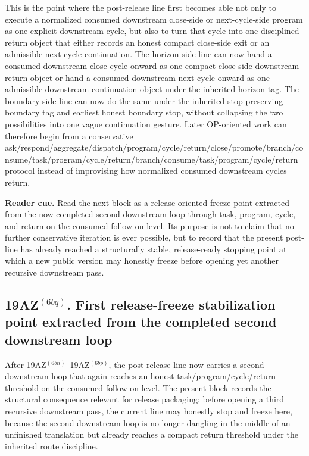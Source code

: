 \begin{remark}
\label{rem:what-the-first-downstream-cycle-to-return-interface-on-the-consumed-follow-on-level-now-buys}
This is the point where the post-release line first becomes able not only to execute a normalized consumed downstream close-side or next-cycle-side program as one explicit downstream cycle, but also to turn that cycle into one disciplined return object that either records an honest compact close-side exit or an admissible next-cycle continuation. The horizon-side line can now hand a consumed downstream close-cycle onward as one compact close-side downstream return object or hand a consumed downstream next-cycle onward as one admissible downstream continuation object under the inherited horizon tag. The boundary-side line can now do the same under the inherited stop-preserving boundary tag and earliest honest boundary stop, without collapsing the two possibilities into one vague continuation gesture. Later OP-oriented work can therefore begin from a conservative ask/\allowbreak{}respond/\allowbreak{}aggregate/\allowbreak{}dispatch/\allowbreak{}program/\allowbreak{}cycle/\allowbreak{}return/\allowbreak{}close/\allowbreak{}promote/\allowbreak{}branch/\allowbreak{}consume/\allowbreak{}task/\allowbreak{}program/\allowbreak{}cycle/\allowbreak{}return/\allowbreak{}branch/\allowbreak{}consume/\allowbreak{}task/\allowbreak{}program/\allowbreak{}cycle/\allowbreak{}return protocol instead of improvising how normalized consumed downstream cycles return.
\end{remark}


\noindent\textbf{Reader cue.} Read the next block as a release-oriented freeze point extracted from the now completed second downstream loop through task, program, cycle, and return on the consumed follow-on level. Its purpose is not to claim that no further conservative iteration is ever possible, but to record that the present post- line has already reached a structurally stable, release-ready stopping point at which a new public version may honestly freeze before opening yet another recursive downstream pass.

\subsection*{19AZ$^{(6bq)}$. First release-freeze stabilization point extracted from the completed second downstream loop}
\label{sec:first-release-freeze-stabilization-point-extracted-from-the-completed-second-downstream-loop}
After 19AZ$^{(6bn)}$--19AZ$^{(6bp)}$, the post-release line now carries a second downstream loop that again reaches an honest task/program/cycle/return threshold on the consumed follow-on level. The present block records the structural consequence relevant for release packaging: before opening a third recursive downstream pass, the current line may honestly stop and freeze here, because the second downstream loop is no longer dangling in the middle of an unfinished translation but already reaches a compact return threshold under the inherited route discipline.

